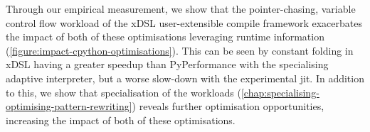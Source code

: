 Through our empirical measurement, we show that the pointer-chasing, variable control flow workload of the xDSL user-extensible compile framework exacerbates the impact of both of these optimisations leveraging runtime information (\autoref{figure:impact-cpython-optimisations}).
This can be seen by constant folding in xDSL having a greater speedup than PyPerformance with the specialising adaptive interpreter, but a worse slow-down with the experimental \ac{jit}.
In addition to this, we show that specialisation of the workloads (\autoref{chap:specialising-optimising-pattern-rewriting}) reveals further optimisation opportunities, increasing the impact of both of these optimisations.











